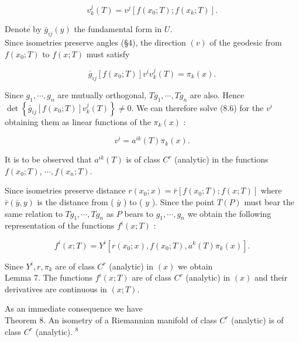 \documentclass[10pt]{article}
\begin{document}
\begin{equation*}
v_{k}^{j}(T)=v^{j}\left[f\left(x_{0} ; T\right) ; f\left(x_{k} ; T\right)\right] . \tag{8.5}
\end{equation*}


Denote by $\bar{g}_{i j}(y)$ the fundamental form in $U$.\\
Since isometries preserve angles (§4), the direction $(v)$ of the geodesic from $f\left(x_{0} ; T\right)$ to $f(x ; T)$ must satisfy


\begin{equation*}
\bar{g}_{i j}\left[f\left(x_{0} ; T\right)\right] v^{i} v_{k}^{j}(T)=\pi_{k}(x) . \tag{8.6}
\end{equation*}


Since $g_{1}, \cdots, g_{n}$ are mutually orthogonal, $T g_{1}, \cdots, T g_{n}$ are also. Hence $\operatorname{det}\left\{\bar{g}_{i j}\left[f\left(x_{0} ; T\right)\right] v_{k}^{j}(T)\right\} \neq 0$. We can therefore solve (8.6) for the $v^{i}$ obtaining them as linear functions of the $\pi_{k}(x)$ :


\begin{equation*}
v^{i}=a^{i k}(T) \pi_{k}(x) . \tag{8.7}
\end{equation*}


It is to be observed that $a^{i k}(T)$ is of class $C^{r}$ (analytic) in the functions $f\left(x_{0} ; T\right)$, $\cdots, f\left(x_{n} ; T\right)$.

Since isometries preserve distance $r\left(x_{0} ; x\right)=\bar{r}\left[f\left(x_{0} ; T\right) ; f(x ; T)\right]$ where $\bar{r}(\bar{y}, y)$ is the distance from ( $\bar{y}$ ) to ( $y$ ). Since the point $T(P)$ must bear the same relation to $T g_{1}, \cdots, T g_{n}$ as $P$ bears to $g_{1}, \cdots, g_{n}$ we obtain the following representation of the functions $f^{i}(x ; T)$ :


\begin{equation*}
f^{i}(x ; T)=Y^{i}\left[r\left(x_{0} ; x\right), f\left(x_{0} ; T\right), a^{k}(T) \pi_{k}(x)\right] . \tag{8.8}
\end{equation*}


Since $Y^{i}, r, \pi_{k}$ are of class $C^{r}$ (analytic) in $(x)$ we obtain\\
Lemma 7. The functions $f^{i}(x ; T)$ are of class $C^{r}$ (analytic) in $(x)$ and their derivatives are continuous in $(x ; T)$.

As an immediate consequence we have\\
Theorem 8. An isometry of a Riemannian manifold of class $C^{r}$ (analytic) is of class $C^{r}$ (analytic). ${ }^{8}$
\end{document}
